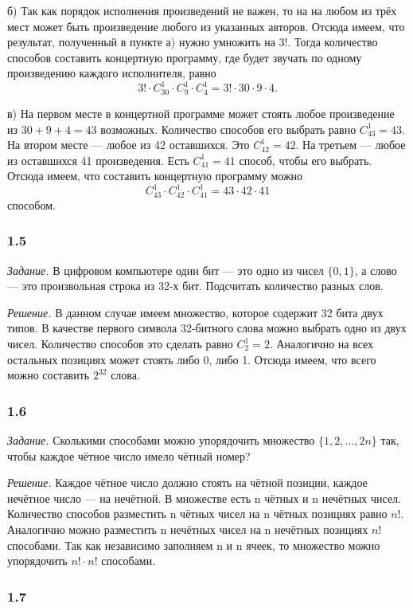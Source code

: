 \documentclass{book}
\begin{document}
б) Так как порядок исполнения произведений не важен, то на на любом из трёх мест может быть произведение любого из указанных авторов. Отсюда имеем, что результат, полученный в пункте а) нужно умножить на $3!$. Тогда количество способов составить концертную программу, где будет звучать по одному произведению каждого исполнителя, равно $$3!\cdot C_{30}^1\cdot C_9^1\cdot C_4^1=3!\cdot 30\cdot 9\cdot 4.$$

в) На первом месте в концертной программе может стоять любое произведение из $30+9+4=43$ возможных. Количество способов его выбрать равно $C_{43}^1=43$. На втором месте --- любое из 42 оставшихся. Это $C_{42}^1=42$. На третьем --- любое из оставшихся 41 произведения. Есть $C_{41}^1=41$ способ, чтобы его выбрать. Отсюда имеем, что составить концертную программу можно $$C_{43}^1\cdot C_{42}^1\cdot C_{41}^1=43\cdot 42\cdot 41$$ способом.

\subsubsection*{1.5}

\textit{Задание.} В цифровом компьютере один бит --- это одно из чисел $\{0, 1\}$, а слово --- это произвольная строка из 32-х бит. Подсчитать количество разных слов.

\textit{Решение.} В данном случае имеем множество, которое содержит 32 бита двух типов. В качестве первого символа 32-битного слова можно выбрать одно из двух чисел. Количество способов это сделать равно $C_{2}^1=2$. Аналогично на всех остальных позициях может стоять либо 0, либо 1. Отсюда имеем, что всего можно составить $2^{32}$ слова.

\subsubsection*{1.6}
\textit{Задание.} Сколькими способами можно упорядочить множество $\{1, 2, ..., 2n\}$ так, чтобы каждое чётное число имело чётный номер?

\textit{Решение.} Каждое чётное число должно стоять на чётной позиции, каждое нечётное число --- на нечётной. В множестве есть n чётных и n нечётных чисел. Количество способов разместить n чётных чисел на n чётных позициях равно $n!$. Аналогично можно разместить n нечётных чисел на n нечётных позициях $n!$ способами. Так как независимо заполняем n и n ячеек, то множество можно упорядочить $n!\cdot n!$ способами.

\subsubsection*{1.7}
\end{document}
